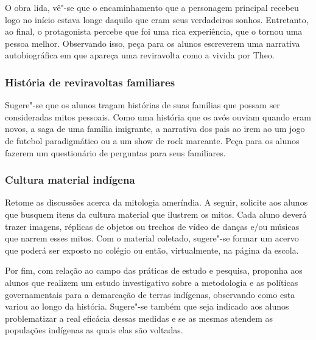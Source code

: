 \documentclass[12pt]{extarticle}
\begin{document}
O obra lida, vê"-se que o encaminhamento que a personagem principal
  recebeu logo no início estava longe daquilo que eram seus verdadeiros
  sonhos. Entretanto, ao final, o protagonista percebe que foi uma rica
  experiência, que o tornou uma pessoa melhor. Observando isso, peça 
  para os alunos
  escreverem uma narrativa autobiográfica
  em que apareça uma reviravolta como a vivida
  por Theo.

\subsubsection{História de reviravoltas familiares}

Sugere"-se que os alunos tragam histórias de suas
  famílias que possam ser consideradas mitos pessoais. Como uma história
  que os avós ouviam quando eram novos, a saga de uma família imigrante,
  a narrativa dos pais ao irem ao um jogo de futebol paradigmático ou a
  um show de rock marcante. Peça para os alunos fazerem um questionário
  de perguntas para seus familiares.

\subsubsection{Cultura material indígena}
Retome as discussões acerca da mitologia ameríndia. A seguir,
  solicite aos alunos que busquem itens da cultura material que ilustrem
  os mitos. Cada aluno deverá trazer imagens, réplicas de objetos ou
  trechos de vídeo de danças e/ou músicas que narrem esses mitos. Com o
  material coletado, sugere"-se formar um acervo que poderá ser exposto
  no colégio ou então, virtualmente, na página da escola.



Por fim, com relação ao campo das práticas de estudo e pesquisa,
proponha aos alunos que realizem um estudo investigativo sobre a
metodologia e as políticas governamentais para a demarcação de terras
indígenas, observando como esta variou ao longo da história.
Sugere"-se também que seja indicado aos alunos problematizar a real
eficácia dessas medidas e se as mesmas atendem as populações indígenas
as quais elas são voltadas.


\end{document}
